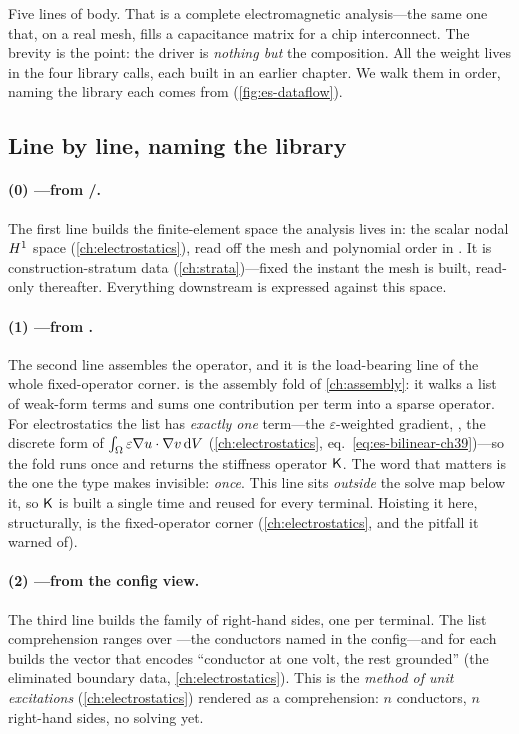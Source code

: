 \noindent Five lines of body. That is a complete electromagnetic analysis---the same
one that, on a real mesh, fills a capacitance matrix for a chip interconnect. The
brevity is the point: the driver is \emph{nothing but} the composition. All the
weight lives in the four library calls, each built in an earlier chapter. We walk
them in order, naming the library each comes from (\cref{fig:es-dataflow}).

\subsection{Line by line, naming the library}
\label{sec:es-linewalk}

\paragraph{(0) ---from /.}
The first line builds the finite-element space the analysis lives in: the scalar
nodal $H^1$ space (\cref{ch:electrostatics}), read off the mesh and polynomial
order in . It is construction-stratum data (\cref{ch:strata})---fixed the
instant the mesh is built, read-only thereafter. Everything downstream is expressed
against this space.

\paragraph{(1) ---from
.} The second line assembles the operator, and it is the
load-bearing line of the whole fixed-operator corner.  is the
assembly fold of \cref{ch:assembly}: it walks a list of weak-form terms and sums one
contribution per term into a sparse operator. For electrostatics the list has
\emph{exactly one} term---the $\varepsilon$-weighted gradient,
, the discrete form of
$\int_\Omega\varepsilon\nabla u\cdot\nabla v\,\mathrm{d}V$ (\cref{ch:electrostatics},
eq.~\eqref{eq:es-bilinear-ch39})---so the fold runs once and returns the stiffness
operator $\mathsf{K}$. The word that matters is the one the type makes invisible:
\emph{once}. This line sits \emph{outside} the solve map below it, so $\mathsf{K}$ is built
a single time and reused for every terminal. Hoisting it here, structurally, is the
fixed-operator corner (\cref{ch:electrostatics}, and the pitfall it warned of).

\paragraph{(2) ---from
the config view.} The third line builds the family of right-hand sides, one per
terminal. The list comprehension ranges over ---the
conductors named in the config---and for each builds the vector
 that encodes ``conductor  at one volt, the rest
grounded'' (the eliminated boundary data, \cref{ch:electrostatics}). This is the
\emph{method of unit excitations} (\cref{ch:electrostatics}) rendered as a
comprehension: $n$ conductors, $n$ right-hand sides, no solving yet.

